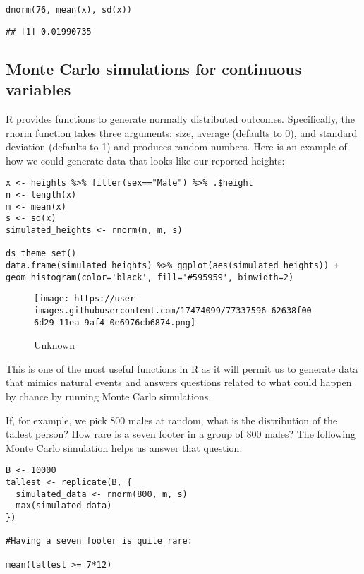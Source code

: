 \documentclass[
]{article}
\begin{document}
\begin{verbatim}
dnorm(76, mean(x), sd(x))
\end{verbatim}

\begin{verbatim}
## [1] 0.01990735
\end{verbatim}

\hypertarget{monte-carlo-simulations-for-continuous-variables}{%
\subsection{Monte Carlo simulations for continuous
variables}\label{monte-carlo-simulations-for-continuous-variables}}

R provides functions to generate normally distributed outcomes.
Specifically, the rnorm function takes three arguments: size, average
(defaults to 0), and standard deviation (defaults to 1) and produces
random numbers. Here is an example of how we could generate data that
looks like our reported heights:

\begin{verbatim}
x <- heights %>% filter(sex=="Male") %>% .$height
n <- length(x)
m <- mean(x)
s <- sd(x)
simulated_heights <- rnorm(n, m, s)

ds_theme_set()
data.frame(simulated_heights) %>% ggplot(aes(simulated_heights)) + geom_histogram(color='black', fill='#595959', binwidth=2)
\end{verbatim}

\begin{figure}
\centering
\texttt{[image: https://user-images.githubusercontent.com/17474099/77337596-62638f00-6d29-11ea-9af4-0e6976cb6874.png]}
\caption{Unknown}
\end{figure}

This is one of the most useful functions in R as it will permit us to
generate data that mimics natural events and answers questions related
to what could happen by chance by running Monte Carlo simulations.

If, for example, we pick 800 males at random, what is the distribution
of the tallest person? How rare is a seven footer in a group of 800
males? The following Monte Carlo simulation helps us answer that
question:

\begin{verbatim}
B <- 10000
tallest <- replicate(B, {
  simulated_data <- rnorm(800, m, s)
  max(simulated_data)
})

#Having a seven footer is quite rare:

mean(tallest >= 7*12)
\end{verbatim}
\end{document}
